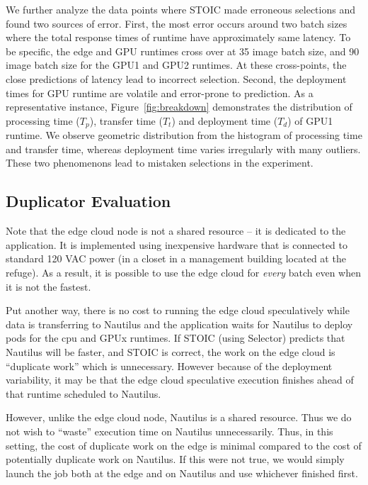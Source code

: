 We further analyze the data points where STOIC made erroneous selections and
found two sources of error. First, the most error occurs around two batch
sizes where the total response times of runtime have approximately same
latency. To be specific, the edge and GPU runtimes cross over at 35 image
batch size, and 90 image batch size for the GPU1 and GPU2 runtimes. At these
cross-points, the close predictions of latency lead to incorrect selection.
Second, the deployment times for GPU runtime are volatile and error-prone to
prediction. As a representative instance, Figure~\ref{fig:breakdown}
demonstrates the distribution of processing time ($T_p$), transfer time
($T_t$) and deployment time ($T_d$) of GPU1 runtime. We observe geometric
distribution from the histogram of processing time and transfer time, whereas
deployment time varies irregularly with many outliers. These two phenomenons
lead to mistaken selections in the experiment.

\subsection{Duplicator Evaluation}

Note that the edge cloud node is not a shared resource -- it is dedicated to
the application. It is implemented using inexpensive hardware that is
connected to standard 120 VAC power (in a closet in a management building
located at the refuge).
As a result,
it is possible to use the edge cloud for \textit{every} batch even when it is
not the fastest.  

Put another way, there is no cost to running the edge cloud speculatively
while data is transferring to Nautilus and the application waits for Nautilus
to deploy pods for the cpu and GPUx runtimes. If STOIC (using Selector)
predicts that Nautilus will be faster, and STOIC is correct, the work on the
edge cloud is ``duplicate work'' which is unnecessary. However because of the
deployment variability, it may be that the edge cloud speculative execution
finishes ahead of that runtime scheduled to Nautilus.

However, unlike the edge cloud node, Nautilus is a shared resource.  Thus we
do not wish to ``waste'' execution time on Nautilus unnecessarily. Thus, in
this setting, the cost of duplicate work on the edge is minimal compared to
the cost of potentially duplicate work on Nautilus. If this were not true, we
would simply launch the job both at the edge and on Nautilus and use whichever
finished first.

